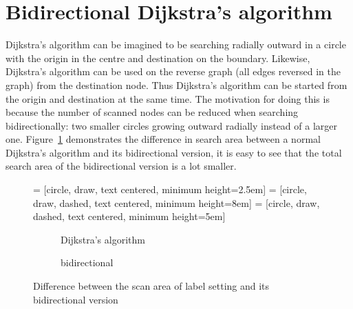 \section{Bidirectional Dijkstra's algorithm} \label{section:bidirectional}
Dijkstra's algorithm can be imagined to be searching radially outward in a circle with the origin in the centre and destination on the boundary.
Likewise, Dijkstra's algorithm can be used on the reverse graph (all edges reversed in the graph) from the destination node.
Thus Dijkstra's algorithm can be started from the origin and destination at the same time.
The motivation for doing this is because the number of scanned nodes can be reduced when searching bidirectionally:
two smaller circles growing outward radially instead of a larger one.
Figure~\ref{fig:bidirect} demonstrates the difference in search area between a normal Dijkstra's algorithm and its bidirectional version,
it is easy to see that the total search area of the bidirectional version is a lot smaller.

\begin{figure}[H]
     = [circle, draw, text centered, minimum height=2.5em]
     = [circle, draw, dashed, text centered, minimum height=8em]
     = [circle, draw, dashed, text centered, minimum height=5em]
    \centering
    \begin{subfigure}[t]{.4\textwidth}
        \centering
        \caption{Dijkstra's algorithm}
    \end{subfigure}
    \begin{subfigure}[t]{.4\textwidth}
        \centering
        \caption{bidirectional}
    \end{subfigure}
    \caption{Difference between the scan area of label setting and its bidirectional version}
    \label{fig:bidirect}
\end{figure}

